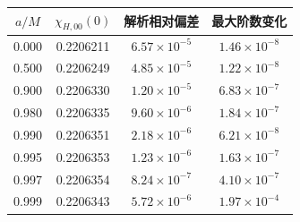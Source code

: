 \documentclass[UTF8,fontset=fandol,12pt,a4paper,oneside,openany]{ctexrep}
\begin{document}
\par\addvspace{14pt}
\noindent\begin{minipage}{\linewidth}
\captionsetup{type=table}\caption{轴对称单极零频外推及解析常数的跨自旋检验。}\label{audit:tab:l0-zero-frequency}
\centering\fontsize{10.5}{14}\selectfont
\setlength{\tabcolsep}{6pt}\renewcommand{\arraystretch}{1.2}
\begin{tabular}{cccc}\toprule
$a/M$ & $\chi_{H,00}(0)$ & 解析相对偏差 & 最大阶数变化\\\midrule
0.000 & 0.2206211 & $6.57\times10^{-5}$ & $1.46\times10^{-8}$\\
0.500 & 0.2206249 & $4.85\times10^{-5}$ & $1.22\times10^{-8}$\\
0.900 & 0.2206330 & $1.20\times10^{-5}$ & $6.83\times10^{-7}$\\
0.980 & 0.2206335 & $9.60\times10^{-6}$ & $1.84\times10^{-7}$\\
0.990 & 0.2206351 & $2.18\times10^{-6}$ & $6.21\times10^{-8}$\\
0.995 & 0.2206353 & $1.23\times10^{-6}$ & $1.63\times10^{-7}$\\
0.997 & 0.2206354 & $8.24\times10^{-7}$ & $4.10\times10^{-7}$\\
0.999 & 0.2206343 & $5.72\times10^{-6}$ & $1.97\times10^{-4}$\\
\bottomrule\end{tabular}
\end{minipage}\par\addvspace{10pt}
\par\addvspace{14pt}
\end{document}
